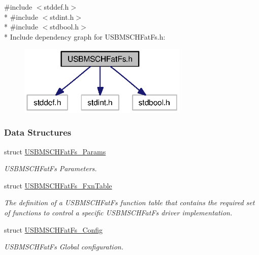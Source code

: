 {\ttfamily \#include $<$stddef.\+h$>$}\\*
{\ttfamily \#include $<$stdint.\+h$>$}\\*
{\ttfamily \#include $<$stdbool.\+h$>$}\\*
Include dependency graph for U\+S\+B\+M\+S\+C\+H\+Fat\+Fs.\+h\+:
\nopagebreak
\begin{figure}[H]
\begin{center}
\leavevmode
\includegraphics[width=229pt]{_u_s_b_m_s_c_h_fat_fs_8h__incl}
\end{center}
\end{figure}
\subsubsection*{Data Structures}
\begin{DoxyCompactItemize}
\item 
struct \hyperlink{struct_u_s_b_m_s_c_h_fat_fs___params}{U\+S\+B\+M\+S\+C\+H\+Fat\+Fs\+\_\+\+Params}
\begin{DoxyCompactList}\small\item\em U\+S\+B\+M\+S\+C\+H\+Fat\+Fs Parameters. \end{DoxyCompactList}\item 
struct \hyperlink{struct_u_s_b_m_s_c_h_fat_fs___fxn_table}{U\+S\+B\+M\+S\+C\+H\+Fat\+Fs\+\_\+\+Fxn\+Table}
\begin{DoxyCompactList}\small\item\em The definition of a U\+S\+B\+M\+S\+C\+H\+Fat\+Fs function table that contains the required set of functions to control a specific U\+S\+B\+M\+S\+C\+H\+Fat\+Fs driver implementation. \end{DoxyCompactList}\item 
struct \hyperlink{struct_u_s_b_m_s_c_h_fat_fs___config}{U\+S\+B\+M\+S\+C\+H\+Fat\+Fs\+\_\+\+Config}
\begin{DoxyCompactList}\small\item\em U\+S\+B\+M\+S\+C\+H\+Fat\+Fs Global configuration. \end{DoxyCompactList}\end{DoxyCompactItemize}
